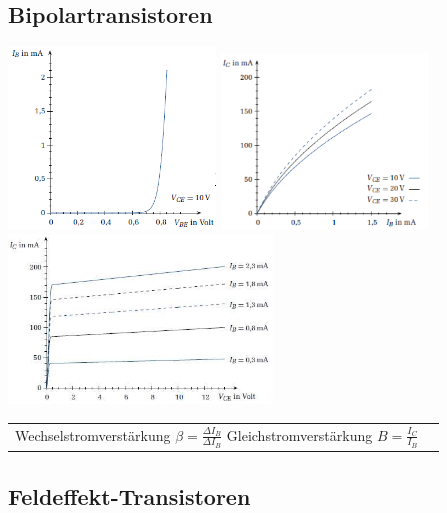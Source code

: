 \subsection{Bipolartransistoren}
\includegraphics[width=5.5cm]{bilder/bipolarEingangsKennlinie}
\includegraphics[width=5.5cm]{bilder/bipolarVerstaerkungsKennlinie}
\includegraphics[width=7cm]{bilder/bipolarAusgangsKennlinie}\\
\begin{tabular}{ll}
	Wechselstromverstärkung $\beta = \frac{\Delta I_B}{\Delta I_B} $
	Gleichstromverstärkung $B = \frac{I_C}{I_B}$\\
\end{tabular}

\subsection{Feldeffekt-Transistoren}

